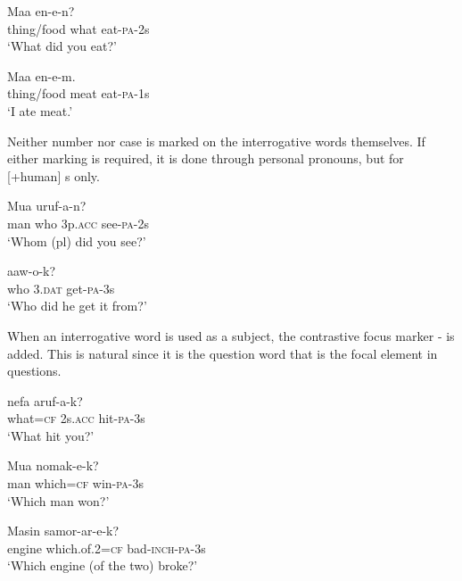 \ea%
\label{ex:3:x521}
\gll Maa  en-e-n? \\
thing/food what eat-\textsc{pa}-2s\\
\glt`What did you eat?'
\z

\ea%
\label{ex:3:x648}
\gll Maa  en-e-m. \\
thing/food meat eat-\textsc{pa}-1s\\
\glt`I ate meat.'
\z

Neither number nor case is marked on the interrogative words themselves. If either marking is required, it is done through personal pronouns, but for [+human] s only.

\ea%
\label{ex:3:x522}
\gll Mua   uruf-a-n? \\
man who 3p.\textsc{acc} see-\textsc{pa}-2s\\
\glt`Whom (pl) did you see?'
\z

\ea%
\label{ex:3:x523}
\gll {}  aaw-o-k? \\
who 3.\textsc{dat} get-\textsc{pa}-3s\\
\glt`Who did he get it from?'
\z

When an interrogative word is used as a subject, the contrastive focus marker \nobreakdash- is added. This is natural since it is the question word that is the focal element in questions. 

\ea%
\label{ex:3:x524}
\gll {} nefa aruf-a-k? \\
what=\textsc{cf} 2s.\textsc{acc} hit-\textsc{pa}-3s\\
\glt`What hit you?'
\z

\ea%
\label{ex:3:x525}
\gll Mua  nomak-e-k? \\
man which=\textsc{cf} win-\textsc{pa}-3s\\
\glt`Which man won?'
\z

\ea%
\label{ex:3:x526}
\gll Masin  samor-ar-e-k? \\
engine which.of.2=\textsc{cf} bad-\textsc{inch}-\textsc{pa}-3s\\
\glt`Which engine (of the two) broke?'
\z


